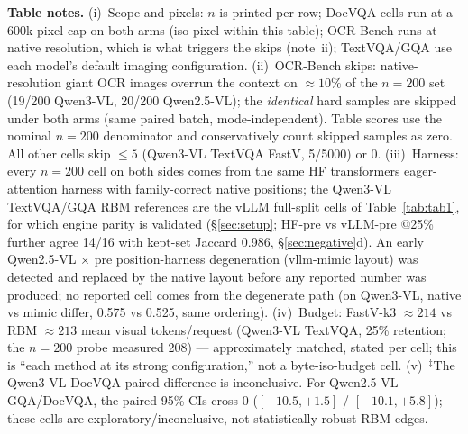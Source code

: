\documentclass[sigconf,review,anonymous]{acmart}
\begin{document}
\begin{table}[t]
  \vspace{3pt}
  \footnotesize
  \textbf{Table notes.} (i)~Scope and pixels: $n$ is printed per row; DocVQA
  cells run at a 600k pixel cap on both arms (iso-pixel within this table);
  OCR-Bench runs at native resolution, which is what triggers the skips
  (note~ii); TextVQA/GQA use each model's default imaging configuration.
  (ii)~OCR-Bench skips: native-resolution giant OCR images overrun the context
  on $\approx 10\%$ of the $n = 200$ set (19/200 Qwen3-VL, 20/200 Qwen2.5-VL);
  the \emph{identical} hard samples are skipped under both arms (same paired
  batch, mode-independent). Table scores use the nominal $n=200$ denominator
  and conservatively count skipped samples as zero. All other cells skip
  $\leq 5$ (Qwen3-VL TextVQA
  FastV, 5/5000) or 0. (iii)~Harness: every $n = 200$ cell on both sides comes
  from the same HF transformers eager-attention harness with family-correct
  native positions; the Qwen3-VL TextVQA/GQA RBM references are the vLLM
  full-split cells of Table~\ref{tab:tab1}, for which engine parity is validated
  (\S\ref{sec:setup}; HF-pre vs vLLM-pre @25\% further agree 14/16 with kept-set
  Jaccard 0.986, \S\ref{sec:negative}d). An early Qwen2.5-VL $\times$ pre
  position-harness degeneration (vllm-mimic layout) was detected and replaced by
  the native layout before any reported number was produced; no reported cell
  comes from the degenerate path (on Qwen3-VL, native vs mimic differ, 0.575 vs
  0.525, same ordering). (iv)~Budget: FastV-k3 $\approx 214$ vs RBM
  $\approx 213$ mean visual tokens/request (Qwen3-VL TextVQA, 25\% retention;
  the $n = 200$ probe measured 208) --- approximately matched, stated per cell;
  this is ``each method at its strong configuration,'' not a byte-iso-budget
  cell. (v)~$^{\ddagger}$The Qwen3-VL DocVQA paired difference is inconclusive.
  For Qwen2.5-VL GQA/DocVQA, the paired 95\% CIs cross 0
  ($[-10.5, +1.5]$ / $[-10.1, +5.8]$); these cells are
  exploratory/inconclusive, not statistically robust RBM edges.
\end{table}

\end{document}
